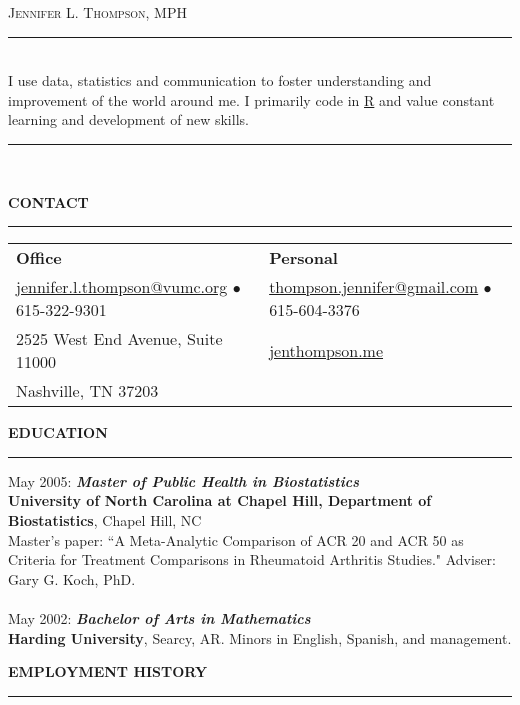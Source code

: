 \documentclass[5pt]{article}
\begin{document}
\begin{center}
\textsc{\Huge{Jennifer L. Thompson, MPH}}
\rule[5pt]{\linewidth}{0.25pt}\\
\noindent I use data, statistics and communication to foster understanding and improvement of the world around me. I primarily code in \href{http://www.r-project.org}{R} and value constant learning and development of new skills.\\
\rule[5pt]{\linewidth}{0.25pt}\\
\end{center}

\noindent \textbf{CONTACT}\\
\rule[5pt]{\linewidth}{1.0pt}

\begin{tabular}{ l l }
\textbf{Office} & \textbf{Personal} \\
\href{mailto:jennifer.l.thompson@vumc.org}{jennifer.l.thompson@vumc.org} $\bullet$ 615-322-9301 &
\href{mailto:thompson.jennifer@gmail.com}{thompson.jennifer@gmail.com} $\bullet$ 615-604-3376 \\
2525 West End Avenue, Suite 11000 &
\href{https://jenthompson.me}{jenthompson.me} \\
Nashville, TN 37203 & \\
\end{tabular}

\noindent \linebreak \linebreak \textbf{EDUCATION}\\
\rule[5pt]{\linewidth}{1.0pt}
\noindent May 2005: \textbf{\emph{Master of Public Health in Biostatistics}}\\
\noindent \textbf{University of North Carolina at Chapel Hill, Department of Biostatistics}, Chapel Hill, NC\\
\indent Master's paper: ``A Meta-Analytic Comparison of ACR 20 and ACR 50 as Criteria for Treatment
\indent Comparisons in Rheumatoid Arthritis Studies." Adviser: Gary G. Koch, PhD.
\\ \\
\noindent May 2002: \textbf{\emph{Bachelor of Arts in Mathematics}}\\
\textbf{Harding University}, Searcy, AR. Minors in English, Spanish, and management.

\noindent \linebreak \textbf{EMPLOYMENT HISTORY}\\
\rule[5pt]{\linewidth}{1.0pt}
\end{document}
